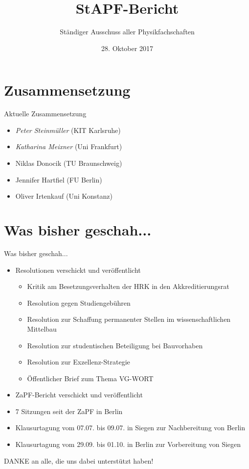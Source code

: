 \documentclass[compress, aspectratio=169]{beamer}
\title[StAPf-Bericht]{StAPF-Bericht}
\author{Ständiger Ausschuss aller Physikfachschaften}
\institute[Zusammenkunft aller Physikfachschaften]
\date{28. Oktober 2017}
\begin{document}
\begin{frame}[plain]{}
  \titlepage
\end{frame}

\section{Zusammensetzung}

\begin{frame}{Aktuelle Zusammensetzung}
  \begin{itemize}
  \item \emph{Peter Steinmüller} (KIT Karlsruhe)
  \item \emph{Katharina Meixner} (Uni Frankfurt)
  \item Niklas Donocik (TU Braunschweig)
  \item Jennifer Hartfiel (FU Berlin)
  \item Oliver Irtenkauf (Uni Konstanz)
  \end{itemize}
\end{frame}

\section{Was bisher geschah...}

\begin{frame}{Was bisher geschah...}
  \begin{itemize}
  \item Resolutionen verschickt und veröffentlicht
    \begin{itemize}
    \item Kritik am Besetzungsverhalten der HRK in den Akkreditierungsrat
    \item Resolution gegen Studiengebühren
    \item Resolution zur Schaffung permanenter Stellen im wissenschaftlichen Mittelbau
    \item Resolution zur studentischen Beteiligung bei Bauvorhaben
    \item Resolution zur Exzellenz-Strategie
    \item Öffentlicher Brief zum Thema VG-WORT
    \end{itemize}
  \end{itemize}
\end{frame}

\begin{frame}
  \begin{itemize}
    \item ZaPF-Bericht verschickt und veröffentlicht
    \item 7 Sitzungen seit der ZaPF in Berlin
    \item Klausurtagung vom 07.07. bis 09.07. in Siegen zur Nachbereitung von Berlin
    \item Klausurtagung vom 29.09. bis 01.10. in Berlin zur Vorbereitung von Siegen
    \end{itemize}
    \vspace{5mm}
    \begin{center}
      \Large DANKE an alle, die uns dabei unterstützt haben!
    \end{center}
\end{frame}
\end{document}
